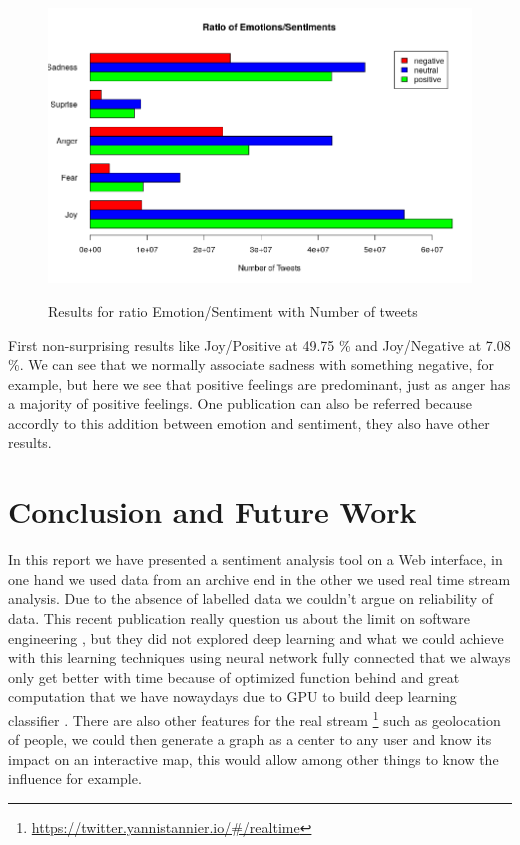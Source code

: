 \documentclass{acmtog} %
\begin{document}
\begin{itemize}
\begin{figure}[h!]
{\includegraphics[width=\linewidth]{final_plot_contradiction_analysis.png}}
\caption{Results for ratio Emotion/Sentiment with Number of tweets}
  \label{fig:contradiction_barplot}
\end{figure}

First non-surprising results like Joy/Positive at 49.75 \% and Joy/Negative at 7.08 \%.
We can see that we normally associate sadness with something negative, for example, but here we see that positive feelings are predominant, just as anger has a majority of positive feelings. One publication can also be referred \cite{Alm05}  because accordly to this addition between emotion and sentiment, they also have other results.


\section{Conclusion and Future Work}
\label{sec:conclusion}

In this report we have presented a sentiment analysis tool on a Web interface, in one hand we used data from an archive end in the other we used real time stream analysis. Due to the absence of labelled data we couldn't argue on reliability of data.  This recent publication really question us about the limit on software engineering \cite{Lin18}, but they did not explored deep learning \cite{Meisheri17} and what we could achieve with this learning techniques using neural network fully connected that we always only get better with time because of optimized function behind and great computation that we have nowaydays due to GPU to build deep learning classifier \cite{Araque17}. 
There are also other features for the real stream \footnote{\url{https://twitter.yannistannier.io/#/realtime}} such as geolocation of people, we could then generate a graph as a center to any user and know its impact on an interactive map, this would allow among other things to know the influence for example.


\end{itemize}
\end{document}
